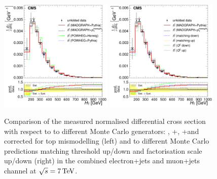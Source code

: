 \begin{figure}[hbtp]
    \centering
     \includegraphics[width=0.48\textwidth]{Chapters/04_Analysis/04b_XSections/images/results/7TeV/HT/central/normalised_xsection_combined_different_generators.pdf}\hfill
     \includegraphics[width=0.48\textwidth]{Chapters/04_Analysis/04b_XSections/images/results/7TeV/HT/central/normalised_xsection_combined_systematics_shifts.pdf}\hfill
     \caption{Comparison of the measured normalised differential cross section with respect to \HT to
     different Monte Carlo generators: \MADGRAPH, \POWHEG+\HERWIG, \POWHEG+\PYTHIA and \MADGRAPH corrected for
     top \pt mismodelling (left) and to different Monte Carlo predictions matching threshold up/down and
     factorisation scale up/down (right) in the combined electron+jets and muon+jets channel at
     $\sqrt{s}=7\,\text{Te\hspace{-.08em}V}$.}
     \label{fig:result_HT_7TeV_combined}
\end{figure}

